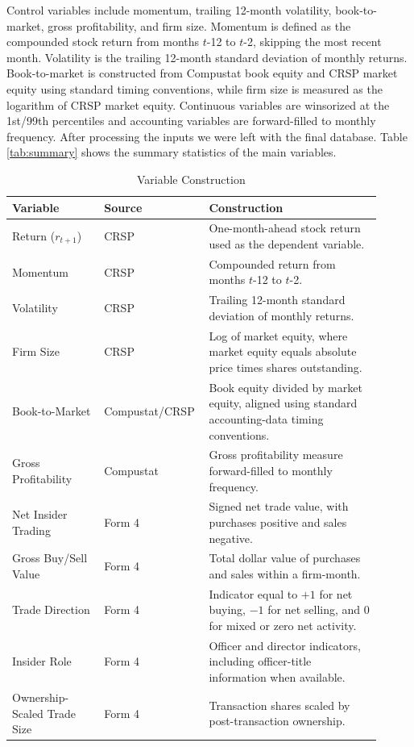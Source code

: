 \documentclass{article}
\begin{document}
Control variables include momentum, trailing 12-month volatility, book-to-market, gross profitability, and firm size. Momentum is defined as the compounded stock return from months $t$-12 to $t$-2, skipping the most recent month. Volatility is the trailing 12-month standard deviation of monthly returns. Book-to-market is constructed from Compustat book equity and CRSP market equity using standard timing conventions, while firm size is measured as the logarithm of CRSP market equity. Continuous variables are winsorized at the 1st/99th percentiles and accounting variables are forward-filled to monthly frequency. After processing the inputs we were left with the final database. Table \ref{tab:summary} shows the summary statistics of the main variables.

\begin{table}[h!]
\centering
\caption{Variable Construction}
\label{tab:variables}
\small
\begin{tabular}{p{0.24\linewidth}p{0.22\linewidth}p{0.45\linewidth}}
\toprule
Variable & Source & Construction \\
\midrule
Return ($r_{t+1}$) & CRSP & One-month-ahead stock return used as the dependent variable. \\
Momentum & CRSP & Compounded return from months $t$-12 to $t$-2. \\
Volatility & CRSP & Trailing 12-month standard deviation of monthly returns. \\
Firm Size & CRSP & Log of market equity, where market equity equals absolute price times shares outstanding. \\
Book-to-Market & Compustat/CRSP & Book equity divided by market equity, aligned using standard accounting-data timing conventions. \\
Gross Profitability & Compustat & Gross profitability measure forward-filled to monthly frequency. \\
Net Insider Trading & Form 4 & Signed net trade value, with purchases positive and sales negative. \\
Gross Buy/Sell Value & Form 4 & Total dollar value of purchases and sales within a firm-month. \\
Trade Direction & Form 4 & Indicator equal to $+1$ for net buying, $-1$ for net selling, and $0$ for mixed or zero net activity. \\
Insider Role & Form 4 & Officer and director indicators, including officer-title information when available. \\
Ownership-Scaled Trade Size & Form 4 & Transaction shares scaled by post-transaction ownership. \\

\end{tabular}
\end{table}
\end{document}
